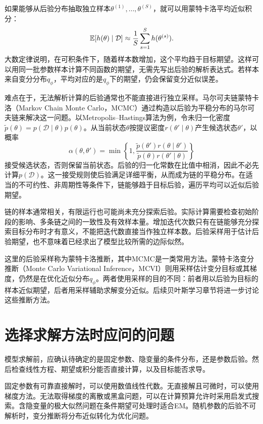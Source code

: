 如果能够从后验分布抽取独立样本$\theta^{(1)},\ldots,\theta^{(S)}$，就可以用蒙特卡洛平均近似积分：
\begin{equation}
 \mathbb{E}[h(\theta)\mid\mathcal D]
 \approx\frac1S\sum_{s=1}^S h(\theta^{(s)}).
\end{equation}
大数定律说明，在可积条件下，随着样本数增加，这个平均趋于目标期望。这样可以用同一批参数样本计算不同函数的期望，无需先写出后验的解析表达式。若样本来自变分分布$q_\phi$，平均对应的是$q_\phi$下的期望，仍会保留变分近似误差。

难点在于，无法解析计算的后验通常也不能直接进行独立采样。马尔可夫链蒙特卡洛（Markov Chain Monte Carlo，MCMC）通过构造以后验为平稳分布的马尔可夫链来解决这一问题。以Metropolis--Hastings算法为例，令未归一化密度$\widetilde p(\theta)=p(\mathcal D\mid\theta)p(\theta)$。从当前状态$\theta$按提议密度$r(\theta'\mid\theta)$产生候选状态$\theta'$，以概率
\begin{equation}
 \alpha(\theta,\theta')=\min\left\{1,
 \frac{\widetilde p(\theta')r(\theta\mid\theta')}
 {\widetilde p(\theta)r(\theta'\mid\theta)}\right\}
\end{equation}
接受候选状态，否则保留当前状态。后验的归一化常数在比值中相消，因此不必先计算$p(\mathcal D)$。这一接受规则使后验满足详细平衡，从而成为链的平稳分布。在适当的不可约性、非周期性等条件下，链能够趋于目标后验，遍历平均可以近似后验期望。

链的样本通常相关，有限运行也可能尚未充分探索后验。实际计算需要检查初始阶段的影响、多条链之间的一致性及有效样本量。增加迭代次数只有在链能够充分探索目标分布时才有意义，不能把迭代数直接当作独立样本数。后验采样用于估计后验期望，也不意味着已经求出了模型比较所需的边际似然。

这里的后验采样称为蒙特卡洛推断，其中MCMC是一类常用方法。蒙特卡洛变分推断（Monte Carlo Variational Inference，MCVI）则用采样估计变分目标或其梯度，仍然是在优化近似分布$q_\phi$。两者使用采样的目的不同：前者用以后验为目标的样本近似期望，后者用采样辅助求解变分近似。后续贝叶斯学习章节将进一步讨论这些推断方法。

\section{选择求解方法时应问的问题}

模型求解前，应确认待确定的是固定参数、隐变量的条件分布，还是参数后验。然后检查线性方程、期望或积分能否直接计算，以及目标能否求导。

固定参数有可靠直接解时，可以使用数值线性代数。无直接解且可微时，可以使用梯度方法。无法取得梯度的离散或黑盒问题，可以在计算预算允许时采用启发式搜索。含隐变量的极大似然问题在条件期望可处理时适合EM。随机参数的后验不可解析时，变分推断将分布近似转化为优化问题。

